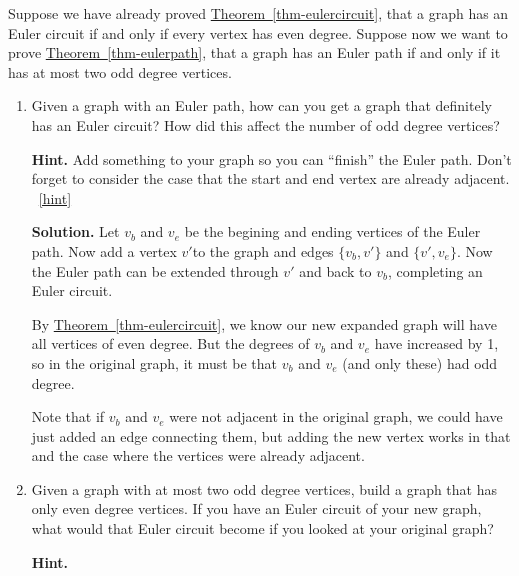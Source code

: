 \documentclass{book}
\begin{document}
\setcounter{project}{15}
\addtocounter{project}{-1}
\begin{activity}[]\label{activity-10}
\hypertarget{p-180}{}%
Suppose we have already proved \hyperref[thm-eulercircuit]{Theorem~\ref{thm-eulercircuit}}, that a graph has an Euler circuit if and only if every vertex has even degree.  Suppose now we want to prove \hyperref[thm-eulerpath]{Theorem~\ref{thm-eulerpath}}, that a graph has an Euler path if and only if it has at most two odd degree vertices.%
\begin{enumerate}[font=\bfseries,label=(\alph*),ref=\alph*]
\item\label{task-13} \hypertarget{p-181}{}%
Given a graph with an Euler path, how can you get a graph that definitely has an Euler circuit?  How did this affect the number of odd degree vertices?%
\par\smallskip%
\noindent\textbf{Hint.}\hypertarget{hint-2}{}\quad%
\hypertarget{p-182}{}%
Add something to your graph so you can ``finish'' the Euler path.  Don't forget to consider the case that the start and end vertex are already adjacent.%
~\hfill{\tiny\hyperlink{a-15.a}{[hint]}\hypertarget{q-15.a}{}}\par\smallskip%
\noindent\textbf{Solution.}\hypertarget{solution-9}{}\quad%
\hypertarget{p-183}{}%
Let \(v_b\) and \(v_e\) be the begining and ending vertices of the Euler path.  Now add a vertex \(v'\)to the graph and edges \(\{v_b, v'\}\) and \(\{v', v_e\}\).  Now the Euler path can be extended through \(v'\) and back to \(v_b\), completing an Euler circuit.%
\par
\hypertarget{p-184}{}%
By \hyperref[thm-eulercircuit]{Theorem~\ref{thm-eulercircuit}}, we know our new expanded graph will have all vertices of even degree.  But the degrees of \(v_b\) and \(v_e\) have increased by 1, so in the original graph, it must be that \(v_b\) and \(v_e\) (and only these) had odd degree.%
\par
\hypertarget{p-185}{}%
Note that if \(v_b\) and \(v_e\) were not adjacent in the original graph, we could have just added an edge connecting them, but adding the new vertex works in that and the case where the vertices were already adjacent.%
\item\label{task-14} \hypertarget{p-186}{}%
Given a graph with at most two odd degree vertices, build a graph that has only even degree vertices.  If you have an Euler circuit of your new graph, what would that Euler circuit become if you looked at your original graph?%
\par\smallskip%
\noindent\textbf{Hint.}\hypertarget{hint-3}{}\quad%

\end{enumerate}
\end{activity}
\end{document}
